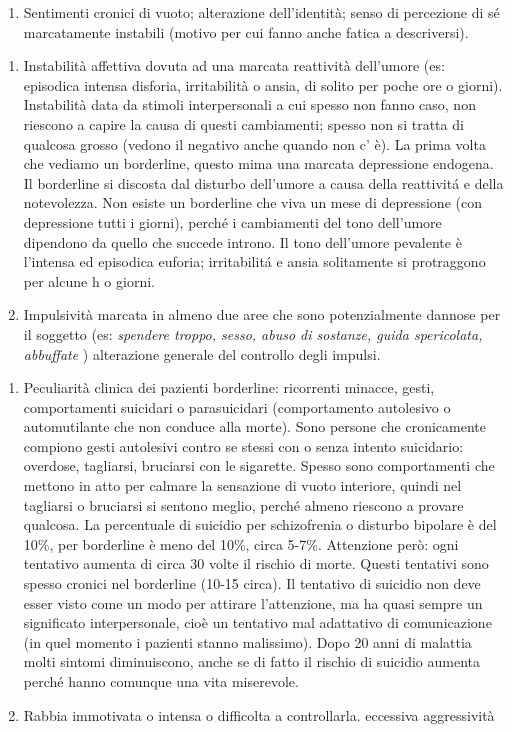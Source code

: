 \documentclass[]{article}
\begin{document}
\begin{enumerate}
\def\labelenumi{\alph{enumi})}
\item
  Sentimenti cronici di vuoto; alterazione dell'identità; senso di
  percezione di sé marcatamente instabili (motivo per cui fanno anche
  fatica a descriversi).
\end{enumerate}

\begin{enumerate}
\def\labelenumi{\arabic{enumi})}
\item
  Instabilità affettiva dovuta ad una marcata reattività dell'umore (es:
  episodica intensa disforia, irritabilità o ansia, di solito per poche
  ore o giorni). Instabilità data da stimoli interpersonali a cui spesso
  non fanno caso, non riescono a capire la causa di questi cambiamenti;
  spesso non si tratta di qualcosa grosso (vedono il negativo anche
  quando non c' è). La prima volta che vediamo un borderline, questo
  mima una marcata depressione endogena. Il borderline si discosta dal
  disturbo dell'umore a causa della reattivitá e della notevolezza. Non
  esiste un borderline che viva un mese di depressione (con depressione
  tutti i giorni), perché i cambiamenti del tono dell'umore dipendono da
  quello che succede introno. Il tono dell'umore pevalente è l'intensa
  ed episodica euforia; irritabilitá e ansia solitamente si protraggono
  per alcune h o giorni.
\item
  Impulsività marcata in almeno due aree che sono potenzialmente dannose
  per il soggetto (es: \emph{spendere troppo, sesso, abuso di sostanze,
  guida spericolata, abbuffate} ) alterazione generale del controllo
  degli impulsi.
\end{enumerate}

\begin{enumerate}
\def\labelenumi{\alph{enumi})}
\item
  Peculiarità clinica dei pazienti borderline: ricorrenti minacce,
  gesti, comportamenti suicidari o parasuicidari (comportamento
  autolesivo o automutilante che non conduce alla morte). Sono persone
  che cronicamente compiono gesti autolesivi contro se stessi con o
  senza intento suicidario: overdose, tagliarsi, bruciarsi con le
  sigarette. Spesso sono comportamenti che mettono in atto per calmare
  la sensazione di vuoto interiore, quindi nel tagliarsi o bruciarsi si
  sentono meglio, perché almeno riescono a provare qualcosa. La
  percentuale di suicidio per schizofrenia o disturbo bipolare è del
  10\%, per borderline è meno del 10\%, circa 5-7\%. Attenzione però:
  ogni tentativo aumenta di circa 30 volte il rischio di morte. Questi
  tentativi sono spesso cronici nel borderline (10-15 circa). Il
  tentativo di suicidio non deve esser visto come un modo per attirare
  l'attenzione, ma ha quasi sempre un significato interpersonale, cioè
  un tentativo mal adattativo di comunicazione (in quel momento i
  pazienti stanno malissimo). Dopo 20 anni di malattia molti sintomi
  diminuiscono, anche se di fatto il rischio di suicidio aumenta perché
  hanno comunque una vita miserevole.
\item
  Rabbia immotivata o intensa o difficolta a controllarla. eccessiva
  aggressività
\end{enumerate}
\end{document}
